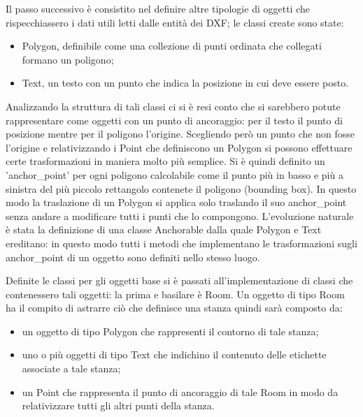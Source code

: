 \documentclass[12pt]{report}
\begin{document}
Il passo successivo è consistito nel definire altre tipologie di oggetti che rispecchiassero i dati utili letti dalle entità dei DXF; le classi create sono state:
\begin{itemize}
\item Polygon, definibile come una collezione di punti ordinata che collegati formano un poligono;
\item Text, un testo con un punto che indica la posizione in cui deve essere posto.
\end{itemize}
Analizzando la struttura di tali classi ci si è resi conto che si sarebbero potute rappresentare come oggetti con un punto di ancoraggio: per il testo il punto di posizione mentre per il poligono l'origine. 
Scegliendo però un punto che non fosse l'origine e relativizzando i Point che definiscono un Polygon si possono effettuare certe trasformazioni in maniera molto più semplice. Si è quindi definito un 'anchor\_point' per ogni poligono calcolabile come il punto più in basso e più a sinistra del più piccolo rettangolo contenete il poligono (bounding box). 
In questo modo la traslazione di un Polygon si applica solo traslando il suo anchor\_point senza andare a modificare tutti i punti che lo compongono. 
L'evoluzione naturale è stata la definizione di una classe Anchorable dalla quale Polygon e Text ereditano: in questo modo tutti i metodi che implementano le trasformazioni sugli anchor\_point di un oggetto sono definiti nello stesso luogo.

Definite le classi per gli oggetti base si è passati all'implementazione di classi che contenessero tali oggetti: la prima e basilare è Room.
Un oggetto di tipo Room ha il compito di astrarre ciò che definisce una stanza quindi sarà composto da:
\begin{itemize}
\item un oggetto di tipo Polygon che rappresenti il contorno di tale stanza;
\item uno o più oggetti di tipo Text che indichino il contenuto delle etichette associate a tale stanza;
\item un Point che rappresenta il punto di ancoraggio di tale Room in modo da relativizzare tutti gli altri punti della stanza.
\end{itemize}
\end{document}

